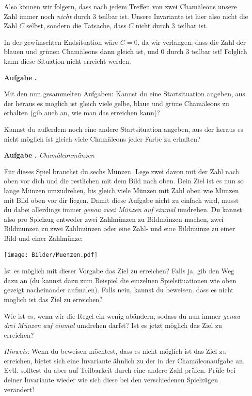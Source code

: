 \documentclass[a4paper,ngerman,12pt]{scrartcl}
\theoremstyle{definition}
\theoremstyle{plain}
\theoremstyle{remark}
\newlength{\aufgabenskip}
\newcounter{aufgabennummer}
\newenvironment{aufgabe}[1]{
	\addtocounter{aufgabennummer}{1}
	\textbf{Aufgabe \theaufgabennummer.} \emph{#1} \par
}{\vspace{\aufgabenskip}}
\begin{document}
Also können wir folgern, dass nach jedem Treffen von zwei Chamäleons unsere Zahl immer noch \emph{nicht} durch 3 teilbar ist. Unsere Invariante ist hier also nicht die Zahl $C$ selbst, sondern die Tatsache, dass $C$ nicht durch 3 teilbar ist. 

In der gewünschten Endsituation wäre $C = 0$, da wir verlangen, dass die Zahl der blauen und grünen Chamäleons dann gleich ist, und $0$ durch $3$ teilbar ist! Folglich kann diese Situation nicht erreicht werden.

\begin{aufgabe}{}
	Mit den nun gesammelten Aufgaben: Kannst du eine Startsituation angeben, aus der heraus es möglich ist gleich viele gelbe, blaue und grüne Chamäleons zu erhalten (gib auch an, wie man das erreichen kann)?
	
	Kannst du außerdem noch eine andere Startsituation angeben, aus der heraus es nicht möglich ist gleich viele Chamäleons jeder Farbe zu erhalten?
\end{aufgabe}

\begin{aufgabe}{Chamäleonmünzen}
	Für dieses Spiel brauchst du sechs Münzen. Lege zwei davon mit der Zahl nach oben vor dich und die restlichen mit dem Bild nach oben. Dein Ziel ist es nun so lange Münzen umzudrehen, bis gleich viele Münzen mit Zahl oben wie Münzen mit Bild oben vor dir liegen. Damit diese Aufgabe nicht zu einfach wird, musst du dabei allerdings immer \emph{genau zwei Münzen auf einmal } umdrehen. Du kannst also pro Spielzug entweder zwei Zahlmünzen zu Bildmünzen machen, zwei Bildmünzen zu zwei Zahlmünzen oder eine Zahl- und eine Bildmünze zu einer Bild und einer Zahlmünze:
	
	\begin{center}
		\texttt{[image: Bilder/Muenzen.pdf]}
	\end{center}
	
	Ist es möglich mit dieser Vorgabe das Ziel zu erreichen? Falls ja, gib den Weg dazu an (du kannst dazu zum Beispiel die einzelnen Spielsituationen wie oben gezeigt nacheinander aufmalen). Falls nein, kannst du beweisen, dass es nicht möglich ist das Ziel zu erreichen? 
	
	Wie ist es, wenn wir die Regel ein wenig abändern, sodass du nun immer \emph{genau drei Münzen auf einmal} umdrehen darfst? Ist es jetzt möglich das Ziel zu erreichen?
	
	\emph{Hinweis:} Wenn du beweisen möchtest, dass es nicht möglich ist das Ziel zu erreichen, bietet sich eine Invariante ähnlich zu der in der Chamäleonaufgabe an. Evtl. solltest du aber auf Teilbarkeit durch eine andere Zahl prüfen. Prüfe bei deiner Invariante wieder wie sich diese bei den verschiedenen Spielzügen verändert!
\end{aufgabe}
\end{document}
